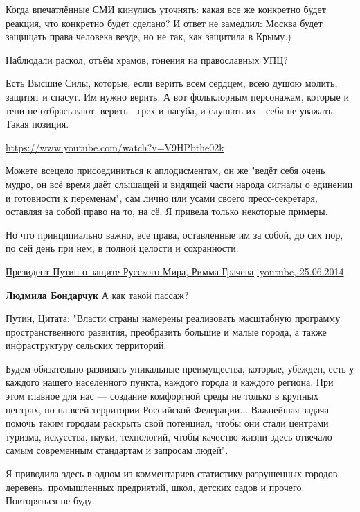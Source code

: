 \begin{itemize}
\begin{itemize}
Когда впечатлённые СМИ кинулись уточнять: какая все же конкретно будет реакция,
что конкретно будет сделано? И ответ не замедлил: Москва будет защищать права
человека везде, но не так, как защитила в Крыму.)

Наблюдали раскол, отъём храмов, гонения на православных УПЦ?

Есть Высшие Силы, которые, если верить всем сердцем, всею душою молить, защитят
и спасут. Им нужно верить. А вот фольклорным персонажам, которые и тени не
отбрасывают, верить - грех и пагуба, и слушать их - себя не уважать. Такая
позиция.

\url{https://www.youtube.com/watch?v=V9HPbthe02k}

Можете всецело присоединиться к аплодисментам, он же "ведёт себя очень мудро,
он всё время даёт слышащей и видящей части народа сигналы о единении и
готовности к переменам", сам лично или усами своего пресс-секретаря, оставляя
за собой право на то, на сё. Я привела только некоторые примеры.

Но что принципиально важно, все права, оставленные им за собой, до сих пор, по
сей день при нем, в полной целости и сохранности.

\href{https://www.youtube.com/watch?v=Znxhc5IWvfM}{%
Президент Путин о защите Русского Мира, Римма Грачева, youtube, 25.06.2014%
}

 
\textbf{Людмила Бондарчук} А как такой пассаж?

Путин, Цитата: "Власти страны намерены реализовать масштабную программу
пространственного развития, преобразить большие и малые города, а также
инфраструктуру сельских территорий.

Будем обязательно развивать уникальные преимущества, которые, убежден, есть у
каждого нашего населенного пункта, каждого города и каждого региона. При этом
главное для нас — создание комфортной среды не только в крупных центрах, но на
всей территории Российской Федерации... Важнейшая задача — помочь таким городам
раскрыть свой потенциал, чтобы они стали центрами туризма, искусства, науки,
технологий, чтобы качество жизни здесь отвечало самым современным стандартам и
запросам людей".

Я приводила здесь в одном из комментариев статистику разрушенных городов,
деревень, промышленных предриятий, школ, детских садов и прочего. Повторяться
не буду.


\end{itemize}
\end{itemize}
